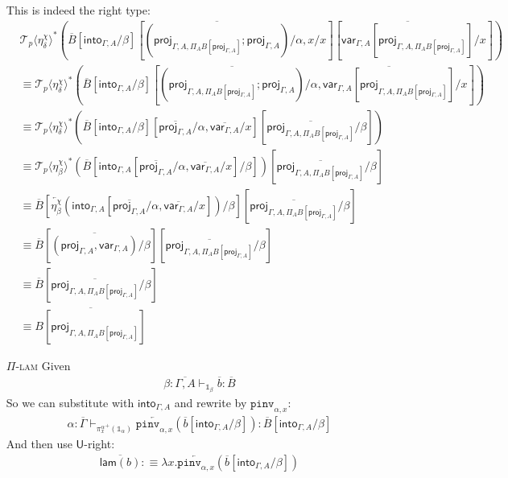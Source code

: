 \documentclass[10pt]{article}
\theoremstyle{definition}
\newcommand{\yields}{\vdash}
\newcommand{\rewrite}[2]{\overleftarrow{#1}(#2)}
\newcommand\UI[2]{\ensuremath{\lambda #1.#2}}
\newcommand\St[2]{\ensuremath{{#1}^*(#2)}}
\newcommand\TrPlus[2]{\ensuremath{{#1}^+(#2)}}
\newcommand\ApEl[2]{\mathcal{T}_{#1}\langle#2\rangle}
\newcommand{\upstairs}[1]{\overline{#1}}
\newcommand\proj[1]{\ensuremath{\mathsf{proj}_{#1}}}
\newcommand\qvar[1]{\ensuremath{\mathsf{var}_{#1}}}
\newcommand\into[1]{\ensuremath{\mathsf{into}_{#1}}}
\newcommand\One{\ensuremath{\mathds{1}}}
\newcommand\pinv[1]{\ensuremath{\mathtt{pinv}_{#1}}}
\newcommand\qlam{\ensuremath{\mathsf{lam}}}
\begin{document}
\begin{enumerate}
This is indeed the right type:
\begin{align*}
&\St{\ApEl{p}{\eta^\chi_\delta}}{\upstairs{B}[\into{\Gamma, A}/\beta][\upstairs{(\proj{\Gamma, A, \Pi_A B[\proj{\Gamma, A}]};\proj{\Gamma, A})}/\alpha, x/x][\upstairs{\qvar{\Gamma, A}[\proj{\Gamma, A, \Pi_A B[\proj{\Gamma, A}]}]}/x]} \\
&\equiv \St{\ApEl{p}{\eta^\chi_\delta}}{\upstairs{B}[\into{\Gamma, A}/\beta][\upstairs{(\proj{\Gamma, A, \Pi_A B[\proj{\Gamma, A}]};\proj{\Gamma, A})}/\alpha, \upstairs{\qvar{\Gamma, A}[\proj{\Gamma, A, \Pi_A B[\proj{\Gamma, A}]}]}/x]} \\
&\equiv \St{\ApEl{p}{\eta^\chi_\delta}}{\upstairs{B}[\into{\Gamma, A}/\beta][\upstairs{\proj{\Gamma, A}}/\alpha, \upstairs{\qvar{\Gamma, A}}/x][\upstairs{\proj{\Gamma, A, \Pi_A B[\proj{\Gamma, A}]}}/\beta]} \\
&\equiv \St{\ApEl{p}{\eta^\chi_\beta}}{\upstairs{B}[\into{\Gamma, A}[\upstairs{\proj{\Gamma, A}}/\alpha, \upstairs{\qvar{\Gamma, A}}/x]/\beta]}[\upstairs{\proj{\Gamma, A, \Pi_A B[\proj{\Gamma, A}]}}/\beta] \\
&\equiv \upstairs{B}[\rewrite{\eta^\chi_\beta}{\into{\Gamma, A}[\upstairs{\proj{\Gamma, A}}/\alpha, \upstairs{\qvar{\Gamma, A}}/x]}/\beta][\upstairs{\proj{\Gamma, A, \Pi_A B[\proj{\Gamma, A}]}}/\beta] \\
&\equiv \upstairs{B}[\upstairs{(\proj{\Gamma, A}, \qvar{\Gamma, A})}/\beta][\upstairs{\proj{\Gamma, A, \Pi_A B[\proj{\Gamma, A}]}}/\beta] \\
&\equiv \upstairs{B}[\upstairs{\proj{\Gamma, A, \Pi_A B[\proj{\Gamma, A}]}}/\beta] \\
&\equiv \upstairs{B[\proj{\Gamma, A, \Pi_A B[\proj{\Gamma, A}]}]}
\end{align*}


\item[\textsc{$\Pi$-lam}] Given
\begin{align*}
\beta : \upstairs{\Gamma, A} \yields_{\One_\beta} \upstairs{b} : \upstairs{B}
\end{align*}
So we can substitute with $\into{\Gamma, A}$ and rewrite by $\pinv{\alpha,x}$:
\begin{align*}
\alpha : \upstairs{\Gamma} \yields_{\TrPlus{\pi^\alpha_x}{\One_{\alpha}}} \rewrite{\pinv{\alpha,x}}{\upstairs{b}[\into{\Gamma, A}/\beta]} : \upstairs{B}[\into{\Gamma, A}/\beta]
\end{align*}
And then use $\mathsf{U}$-right: 
\begin{align*}
\upstairs{\qlam(b)} :\equiv \UI{x}{\rewrite{\pinv{\alpha,x}}{\upstairs{b}[\into{\Gamma, A}/\beta]}}
\end{align*}
\end{enumerate}
\end{document}
